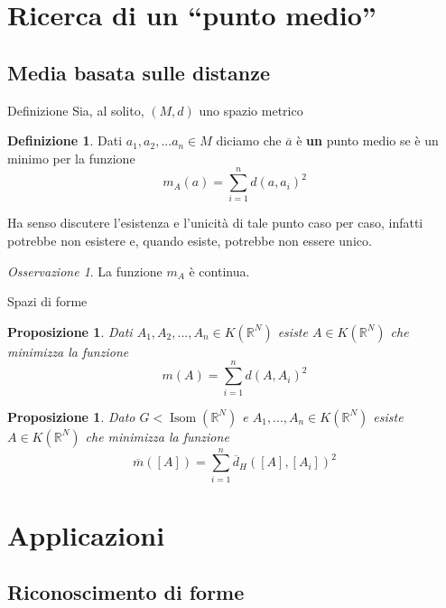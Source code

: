 \documentclass{beamer}
\newcounter{counter1}
\theoremstyle{plain}
\newtheorem{mypro}[counter1]{Proposizione}
\theoremstyle{definition}
\newtheorem{mydef}[counter1]{Definizione}
\theoremstyle{remark}
\newtheorem{myoss}[counter1]{Osservazione}
\newcommand{\obar}[1]{\overline{#1}}
\newcommand{\bra}[1]{\left[#1\right]}
\DeclareMathOperator{\isom}{Isom}
\begin{document}
\section{Ricerca di un ``punto medio''}


\subsection{Media basata sulle distanze}

\begin{frame}{Definizione}
  Sia, al solito, $(M,d)$ uno spazio metrico
  \begin{mydef}
    Dati $a_1,a_2,... a_n \in M$ diciamo che $\obar a$ è \textbf{un}
    punto medio se è un minimo per la funzione
    \[ m_A (a) = \sum _{i = 1} ^n d(a,a_i)^2 \]
  \end{mydef}
  
  Ha senso discutere l'esistenza e l'unicità di tale punto caso per
  caso, infatti potrebbe non esistere e, quando esiste, potrebbe non
  essere unico.

  \begin{myoss}
    La funzione $m_A$ è continua.
  \end{myoss}
\end{frame}


\begin{frame}{Spazi di forme}
  \begin{mypro}
    Dati $A_1, A_2,..., A_n \in K(\mathbb{R}^N)$ esiste $A \in
    K(\mathbb{R}^N)$ che minimizza la funzione
    \[ m(A) = \sum _{i =1} ^n d(A,A_i)^2 \]
  \end{mypro}

  \begin{mypro}
    Dato $G < \isom (\mathbb{R}^N)$ e $A_1,...,A_n \in K(\mathbb{R}^N)$
    esiste $A \in K(\mathbb{R}^N)$ che minimizza la funzione 
    \[ \obar m(\bra{A}) = \sum _{i =1} ^n \obar
    d_H(\bra{A},\bra{A_i})^2 \]
  \end{mypro}
\end{frame}


\section{Applicazioni}

\subsection{Riconoscimento di forme}
\end{document}
